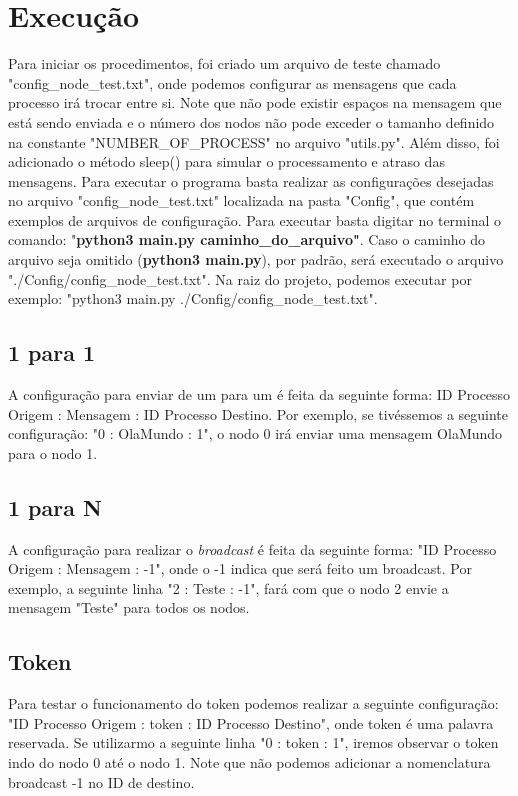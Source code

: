 \documentclass[
	12pt,				%
	openright,			%
	oneside,			%
	a4paper,			%
	english,			%
	french,				%
	spanish,			%
	brazil				%
	]{abntex2}
\begin{document}
\section{Execução}
Para iniciar os procedimentos, foi criado um arquivo de teste chamado "config\_node\_test.txt",
onde podemos configurar as mensagens que cada processo irá trocar entre si.
Note que não pode existir espaços na mensagem que está sendo enviada
e o número dos nodos não pode exceder o tamanho definido na constante
"NUMBER\_OF\_PROCESS" no arquivo "utils.py". Além disso, foi adicionado
o método sleep() para simular o processamento e atraso das mensagens.
Para executar o programa basta realizar as configurações desejadas no arquivo
"config\_node\_test.txt" localizada na pasta "Config", que contém exemplos 
de arquivos de configuração. Para executar basta digitar no terminal o comando: "\textbf{python3 main.py caminho\_do\_arquivo"}.
Caso o caminho do arquivo seja omitido (\textbf{python3 main.py}), por padrão, será executado o arquivo "./Config/config\_node\_test.txt".
Na raiz do projeto, podemos executar por exemplo: "python3 main.py ./Config/config\_node\_test.txt".


\subsection{1 para 1}
A configuração para enviar de um para um é feita da seguinte forma: ID Processo Origem : Mensagem : ID Processo Destino.
Por exemplo, se tivéssemos a seguinte configuração: "0 : OlaMundo : 1", o nodo
0 irá enviar uma mensagem OlaMundo para o nodo 1. 

\subsection{1 para N}
A configuração para realizar o \emph{broadcast} é feita da seguinte forma:
"ID Processo Origem : Mensagem : -1", onde o -1 indica que será feito um broadcast.
Por exemplo, a seguinte linha "2 : Teste : -1", fará com que o nodo 2 envie a mensagem "Teste" para
todos os nodos.

\subsection{Token}
Para testar o funcionamento do token podemos realizar a seguinte configuração:
"ID Processo Origem : token : ID Processo Destino", onde token é uma palavra reservada.
Se utilizarmo a seguinte linha "0 : token : 1", iremos observar o token indo do nodo 0
até o nodo 1. Note que não podemos adicionar a nomenclatura broadcast -1 no ID de destino.
\end{document}
